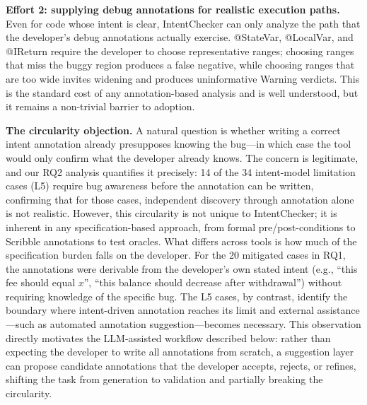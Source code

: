 \documentclass[pdflatex,sn-basic]{sn-jnl}%
\theoremstyle{thmstyleone}%
\theoremstyle{thmstyletwo}%
\theoremstyle{thmstylethree}%
\begin{document}
\smallskip
\noindent\textbf{Effort 2: supplying debug annotations for realistic execution paths.}
Even for code whose intent is clear, IntentChecker can only analyze the path that the developer's debug annotations actually exercise.
@StateVar, @LocalVar, and @IReturn require the developer to choose representative ranges; choosing ranges that miss the buggy region produces a false negative, while choosing ranges that are too wide invites widening and produces uninformative Warning verdicts.
This is the standard cost of any annotation-based analysis and is well understood, but it remains a non-trivial barrier to adoption.

\smallskip
\noindent\textbf{The circularity objection.}
A natural question is whether writing a correct intent annotation already presupposes knowing the bug---in which case the tool would only confirm what the developer already knows.
The concern is legitimate, and our RQ2 analysis quantifies it precisely: 14 of the 34 intent-model limitation cases (L5) require bug awareness before the annotation can be written, confirming that for those cases, independent discovery through annotation alone is not realistic.
However, this circularity is not unique to IntentChecker; it is inherent in any specification-based approach, from formal pre/post-conditions to Scribble annotations to test oracles.
What differs across tools is how much of the specification burden falls on the developer.
For the 20 mitigated cases in RQ1, the annotations were derivable from the developer's own stated intent (e.g., ``this fee should equal $x$'', ``this balance should decrease after withdrawal'') without requiring knowledge of the specific bug.
The L5 cases, by contrast, identify the boundary where intent-driven annotation reaches its limit and external assistance---such as automated annotation suggestion---becomes necessary.
This observation directly motivates the LLM-assisted workflow described below: rather than expecting the developer to write all annotations from scratch, a suggestion layer can propose candidate annotations that the developer accepts, rejects, or refines, shifting the task from generation to validation and partially breaking the circularity.
\end{document}
